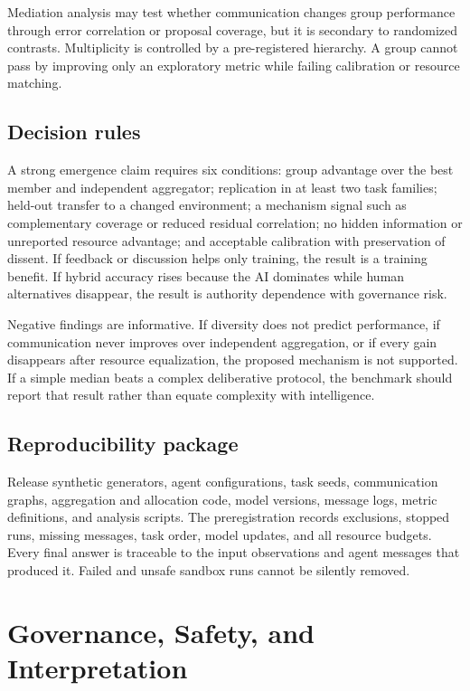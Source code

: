 \documentclass[conference]{IEEEtran}
\begin{document}
Mediation analysis may test whether communication changes group performance through error correlation or proposal coverage, but it is secondary to randomized contrasts. Multiplicity is controlled by a pre-registered hierarchy. A group cannot pass by improving only an exploratory metric while failing calibration or resource matching.

\subsection{Decision rules}

A strong emergence claim requires six conditions: group advantage over the best member and independent aggregator; replication in at least two task families; held-out transfer to a changed environment; a mechanism signal such as complementary coverage or reduced residual correlation; no hidden information or unreported resource advantage; and acceptable calibration with preservation of dissent. If feedback or discussion helps only training, the result is a training benefit. If hybrid accuracy rises because the AI dominates while human alternatives disappear, the result is authority dependence with governance risk.

Negative findings are informative. If diversity does not predict performance, if communication never improves over independent aggregation, or if every gain disappears after resource equalization, the proposed mechanism is not supported. If a simple median beats a complex deliberative protocol, the benchmark should report that result rather than equate complexity with intelligence.

\subsection{Reproducibility package}

Release synthetic generators, agent configurations, task seeds, communication graphs, aggregation and allocation code, model versions, message logs, metric definitions, and analysis scripts. The preregistration records exclusions, stopped runs, missing messages, task order, model updates, and all resource budgets. Every final answer is traceable to the input observations and agent messages that produced it. Failed and unsafe sandbox runs cannot be silently removed.

\section{Governance, Safety, and Interpretation}
\end{document}
